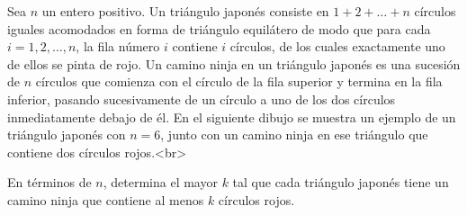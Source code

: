 Sea $n$ un entero positivo. Un triángulo japonés consiste en $1 + 2 + \dots + n$ círculos iguales acomodados en forma de triángulo equilátero de modo que para cada $i = 1, 2, \dots , n$, la fila número $i$ contiene $i$ círculos, de los cuales exactamente uno de ellos se pinta de rojo. Un camino ninja en un triángulo japonés es una sucesión de $n$ círculos que comienza con el círculo de la fila superior y termina en la fila inferior, pasando sucesivamente de un círculo a uno de los dos círculos inmediatamente debajo de él. En el siguiente dibujo se muestra un ejemplo de un triángulo japonés con $n = 6$, junto con un camino ninja en ese triángulo que contiene dos círculos rojos.<br>

En términos de $n$, determina el mayor $k$ tal que cada triángulo japonés tiene un camino ninja que contiene al menos $k$ círculos rojos.

